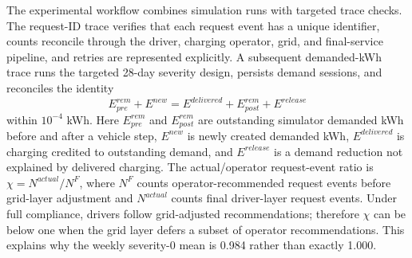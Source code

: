 \documentclass[12pt]{article}
\begin{document}
The experimental workflow combines simulation runs with targeted trace checks. The request-ID trace verifies that each request event has a unique identifier, counts reconcile through the driver, charging operator, grid, and final-service pipeline, and retries are represented explicitly. A subsequent demanded-kWh trace runs the targeted 28-day severity design, persists demand sessions, and reconciles the identity
\begin{equation}
E^{rem}_{pre}+E^{new}=E^{delivered}+E^{rem}_{post}+E^{release}
\label{eq:ledger}
\end{equation}
within $10^{-4}$ kWh. Here $E^{rem}_{pre}$ and $E^{rem}_{post}$ are outstanding simulator demanded kWh before and after a vehicle step, $E^{new}$ is newly created demanded kWh, $E^{delivered}$ is charging credited to outstanding demand, and $E^{release}$ is a demand reduction not explained by delivered charging. The actual/operator request-event ratio is $\chi=N^{actual}/N^F$, where $N^F$ counts operator-recommended request events before grid-layer adjustment and $N^{actual}$ counts final driver-layer request events. Under full compliance, drivers follow grid-adjusted recommendations; therefore $\chi$ can be below one when the grid layer defers a subset of operator recommendations. This explains why the weekly severity-0 mean is 0.984 rather than exactly 1.000.
\end{document}

